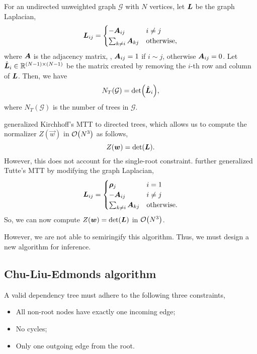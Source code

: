 \begin{theorem} \label{thm:kirchhoff}
  For an undirected unweighted graph $\mathcal{G}$ with $N$ vertices, let
  $\bm{L}$ be the graph Laplacian, \[
    \bm{L}_{ij} = \begin{cases}
      -\bm{A}_{ij} & i \neq j \\
      \sum_{k \neq i} \bm{A}_{kj} & \mathrm{otherwise},
    \end{cases}
  \]
  where $\bm{A}$ is the adjacency matrix, \ie, $\bm{A}_{ij}=1$ if $i \sim j$,
  otherwise $\bm{A}_{ij}=0$. Let $\hat{\bm{L}}_i \in \mathbb{R}^{(N-1)\times(N-1)}$ be the
  matrix created by removing the $i$-th row and column of $\bm{L}$. Then, we
  have \[
    N_T(\mathcal{G}) = \det{\hat{\mat{L}}_i}
  ,\]
  where $N_T(\mathcal{G})$ is the number of trees in $\mathcal{G}$.
\end{theorem}

\citet{tutte1948dissection} generalized Kirchhoff's MTT to directed trees,
which allows us to compute the normalizer $Z(\vec{w})$ in $\bigo{N^3}$ as
follows,
\[
  Z(\bm{w}) = \det{\mat{L}}
.\]
However, this does not account for the single-root constraint.
\citet{koo2007structured} further generalized Tutte's MTT by modifying the
graph Laplacian, \[
  \bm{L}_{ij} = \begin{cases}
    \bm{\rho}_j & i = 1 \\
    -\bm{A}_{ij} & i \neq j \\
    \sum_{k \neq i} \bm{A}_{kj} & \mathrm{otherwise}.
  \end{cases}
\]
So, we can now compute $Z(\vec{w}) = \det{\mat{L}}$ in $\bigo{N^3}$.

However, we are not able to semiringify this algorithm. Thus, we must design a
new algorithm for inference.

\subsection{Chu-Liu-Edmonds algorithm}

A valid dependency tree must adhere to the following three constraints,
\begin{itemize}
  \item All non-root nodes have exactly one incoming edge;
  \item No cycles;
  \item Only one outgoing edge from the root.
\end{itemize}

